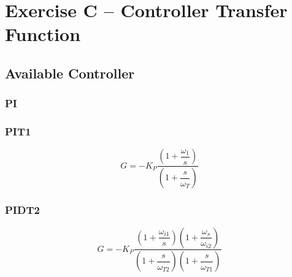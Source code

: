\section{Exercise C -- Controller Transfer Function}

\subsection{Available Controller}

\subsubsection{PI}

\subsubsection{PIT1}
\[
	G
	= -K_P \dfrac{
		\left(1 + \dfrac{\omega_{1}}{s}\right)
	}{ 
		\left(1 + \dfrac{s}{\omega_{T}} \right)
	}
\]
\subsubsection{PIDT2}

\[
	G
	= -K_P \dfrac{
		\left(1 + \dfrac{\omega_{i1}}{s}\right) \left(1 + \dfrac{\omega_{s}}{\omega_{i2}}\right)
	}{ 
		\left(1 + \dfrac{s}{\omega_{T2}} \right) \left(1 + \dfrac{s}{\omega_{T1}} \right)
	}
\]
